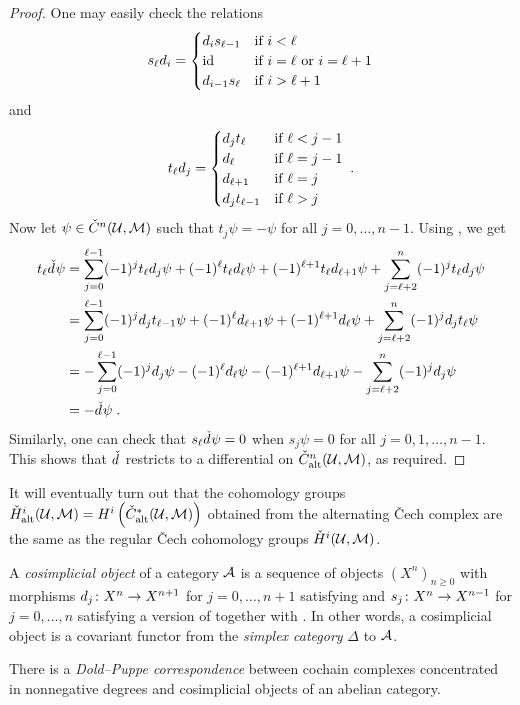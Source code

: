 \documentclass[a4paper,parskip=half,numbers=enddot, DIV=12]{scrreprt}
\newcommand{\vC}{\v{C}}
\begin{document}
\begin{rem}
\begin{proof}
		One may easily check the relations
		\begin{align}\lbl{eq:cosimplicialDegeneracies}
			s_\ell d_i=\begin{cases}
				d_is_{\ell-1} & \text{if }i<\ell\\
				\id &  \text{if }i=\ell\text{ or }i=\ell+1\\
				d_{i-1}s_\ell &  \text{if }i>\ell+1
			\end{cases}
		\end{align}
		and
		\begin{align}\lbl{eq:transpositions}
			t_\ell d_j=\begin{cases}
				d_jt_{\ell} & \text{if }\ell<j-1\\
				d_\ell &  \text{if }\ell=j-1\\
				d_{\ell+1} &  \text{if }\ell=j\\
				d_jt_{\ell-1} & \text{if }\ell>j
			\end{cases}\;.
		\end{align}
		Now let $\psi\in\check{C}^n(\mathcal{U},\mathcal{M})$ such that $t_j\psi=-\psi$ for all $j=0,\ldots,n-1$. Using , we get
		\begin{align*}
			t_\ell\check{d}\hspace{0.06125em}\psi&=\sum_{j=0}^{\ell-1}(-1)^jt_\ell d_j\psi+(-1)^\ell t_\ell d_\ell\psi+(-1)^{\ell+1} t_\ell d_{\ell+1}\psi+\sum_{j=\ell+2}^n(-1)^jt_\ell d_j\psi\\
			&=\sum_{j=0}^{\ell-1}(-1)^jd_jt_{\ell-1}\psi+(-1)^\ell d_{\ell+1}\psi+(-1)^{\ell+1} d_\ell\psi+\sum_{j=\ell+2}^{n}(-1)^j d_jt_\ell\psi\\
			&=-\sum_{j=0}^{\ell-1}(-1)^jd_j\psi-(-1)^\ell d_\ell\psi-(-1)^{\ell+1} d_{\ell+1}\psi-\sum_{j=\ell+2}^{n}(-1)^j d_j\psi\\
			&=-\check{d}\hspace{0.06125em}\psi\;.
		\end{align*}
		Similarly, one can check that $s_\ell\check{d}\hspace{0.06125em}\psi=0$ when $s_j\psi=0$ for all $j=0,1,\ldots,n-1$. This shows that $\check{d}\hspace{0.06125em}$ restricts to a differential on $\check{C}_{\mathrm{alt}}
		^n(\mathcal{U},\mathcal{M})$, as required.
	\end{proof}
	It will eventually turn out that the cohomology groups $\check{H}_{\mathrm{alt}}^i(\mathcal{U},\mathcal{M})=H^i\left(\check{C}_{\mathrm{alt}}^*(\mathcal{U},\mathcal{M})\right)$ obtained from the alternating \vC ech complex are the same as the regular \vC ech cohomology groups $\check{H}^i(\mathcal{U},\mathcal{M})$.
\end{rem}
\begin{rem}
	A \emph{cosimplicial object} of a category $\mathcal{A}$ is a sequence of objects $(X^n)_{n\geq 0}$ with morphisms $d_j\colon X^n\morphism X^{n+1}$ for $j=0,\ldots,n+1$ satisfying  and $s_j\colon X^n\morphism X^{n-1}$ for $j=0,\ldots,n$ satisfying a version of  together with . In other words, a cosimplicial object is a covariant functor from the \emph{simplex category} $\Delta$ to $\mathcal{A}$.
	
	There is a \emph{Dold--Puppe correspondence} between cochain complexes concentrated in nonnegative degrees and cosimplicial objects of an abelian category.  
\end{rem}
\end{document}
